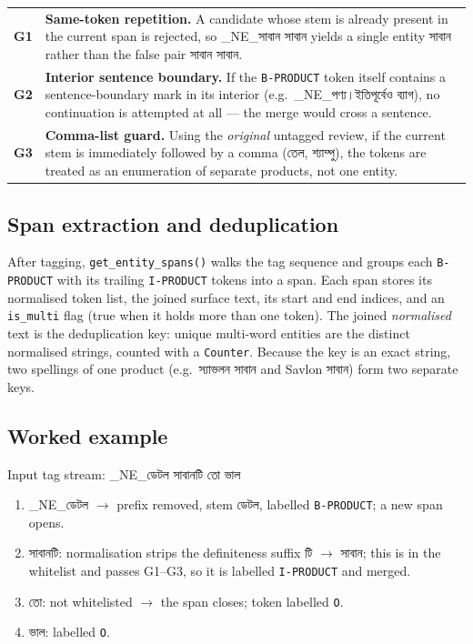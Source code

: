 \documentclass[11pt]{article}
\newcommand{\bn}[1]{{\bnfont #1}}
\begin{document}
\begin{center}
\begin{tabular}{@{}p{1.1cm}p{12.4cm}@{}}
\toprule
\textbf{G1} & \textbf{Same-token repetition.} A candidate whose stem is already
              present in the current span is rejected, so \bn{\_NE\_সাবান সাবান}
              yields a single entity \bn{সাবান} rather than the false pair
              \bn{সাবান সাবান}. \\[3pt]
\textbf{G2} & \textbf{Interior sentence boundary.} If the \texttt{B-PRODUCT}
              token itself contains a sentence-boundary mark in its interior
              (e.g.\ \bn{\_NE\_পণ্য।ইতিপূর্বেও ব্যাগ}), no continuation is
              attempted at all --- the merge would cross a sentence. \\[3pt]
\textbf{G3} & \textbf{Comma-list guard.} Using the \emph{original} untagged
              review, if the current stem is immediately followed by a comma
              (\bn{তেল, শ্যাম্পু}), the tokens are treated as an enumeration of
              separate products, not one entity. \\
\bottomrule
\end{tabular}
\end{center}

\subsection{Span extraction and deduplication}
After tagging, \texttt{get\_entity\_spans()} walks the tag sequence and groups
each \texttt{B-PRODUCT} with its trailing \texttt{I-PRODUCT} tokens into a span.
Each span stores its normalised token list, the joined surface text, its start
and end indices, and an \texttt{is\_multi} flag (true when it holds more than one
token). The joined \emph{normalised} text is the deduplication key: unique
multi-word entities are the distinct normalised strings, counted with a
\texttt{Counter}. Because the key is an exact string, two spellings of one
product (e.g.\ \bn{স্যাভলন সাবান} and \bn{Savlon সাবান}) form two separate keys.

\subsection{Worked example}
Input tag stream: \bn{\_NE\_ডেটল} \bn{সাবানটি} \bn{তো} \bn{ভাল}

\begin{enumerate}
  \item \bn{\_NE\_ডেটল} $\rightarrow$ prefix removed, stem \bn{ডেটল}, labelled
        \texttt{B-PRODUCT}; a new span opens.
  \item \bn{সাবানটি}: normalisation strips the definiteness suffix \bn{টি}
        $\rightarrow$ \bn{সাবান}; this is in the whitelist and passes G1--G3, so
        it is labelled \texttt{I-PRODUCT} and merged.
  \item \bn{তো}: not whitelisted $\rightarrow$ the span closes; token labelled
        \texttt{O}.
  \item \bn{ভাল}: labelled \texttt{O}.
\end{enumerate}
\end{document}
